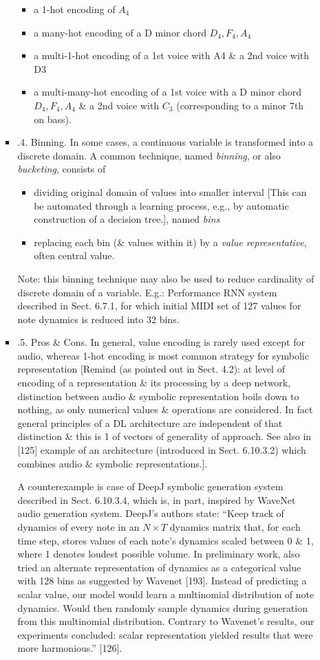 \documentclass{article}
\begin{document}
\begin{itemize}
\begin{itemize}
\begin{itemize}
\begin{itemize}
				\item a 1-hot encoding of $A_4$
				\item a many-hot encoding of a D minor chord $D_4,F_4,A_4$
				\item a multi-1-hot encoding of a 1st voice with A4 \& a 2nd voice with D3
				\item a multi-many-hot encoding of a 1st voice with a D minor chord $D_4,F_4,A_4$ \& a 2nd voice with $C_3$ (corresponding to a minor 7th on bass).
			\end{itemize}
			\item {.4. Binning.} In some cases, a continuous variable is transformed into a discrete domain. A common technique, named {\it binning}, or also {\it bucketing}, consists of
			\begin{itemize}
				\item dividing original domain of values into smaller interval [This can be automated through a learning process, e.g., by automatic construction of a decision tree.], named {\it bins}
				\item replacing each bin (\& values within it) by a {\it value representative}, often central value.
			\end{itemize}
			Note: this binning technique may also be used to reduce cardinality of discrete domain of a variable. E.g.: Performance RNN system described in Sect. 6.7.1, for which initial MIDI set of 127 values for note dynamics is reduced into 32 bins.
			\item {.5. Pros \& Cons.} In general, value encoding is rarely used except for audio, whereas 1-hot encoding is most common strategy for symbolic representation [Remind (as pointed out in Sect. 4.2): at level of encoding of a representation \& its processing by a deep network, distinction between audio \& symbolic representation boils down to nothing, as only numerical values \& operations are considered. In fact general principles of a DL architecture are independent of that distinction \& this is 1 of vectors of generality of approach. See also in [125] example of an architecture (introduced in Sect. 6.10.3.2) which combines audio \& symbolic representations.].

			A counterexample is case of DeepJ symbolic generation system described in Sect. 6.10.3.4, which is, in part, inspired by WaveNet audio generation system. DeepJ's authors state: ``Keep track of dynamics of every note in an $N\times T$ dynamics matrix that, for each time step, stores values of each note's dynamics scaled between 0 \& 1, where 1 denotes loudest possible volume. In preliminary work, also tried an alternate representation of dynamics as a categorical value with 128 bins as suggested by Wavenet [193]. Instead of predicting a scalar value, our model would learn a multinomial distribution of note dynamics. Would then randomly sample dynamics during generation from this multinomial distribution. Contrary to Wavenet's results, our experiments concluded: scalar representation yielded results that were more harmonious.'' [126].


\end{itemize}
\end{itemize}
\end{itemize}
\end{document}
